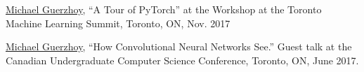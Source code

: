 \documentclass[letterpaper,11pt]{article}
\begin{document}
\begin{revnumerate}







\item
\underline{Michael Guerzhoy}, ``A Tour of PyTorch'' at the  Workshop at the Toronto Machine Learning Summit, Toronto, ON, Nov. 2017

\item
\underline{Michael Guerzhoy}, ``How Convolutional Neural Networks See.'' Guest talk at the Canadian Undergraduate Computer Science Conference, Toronto, ON, June 2017.






\end{revnumerate}
\end{document}
